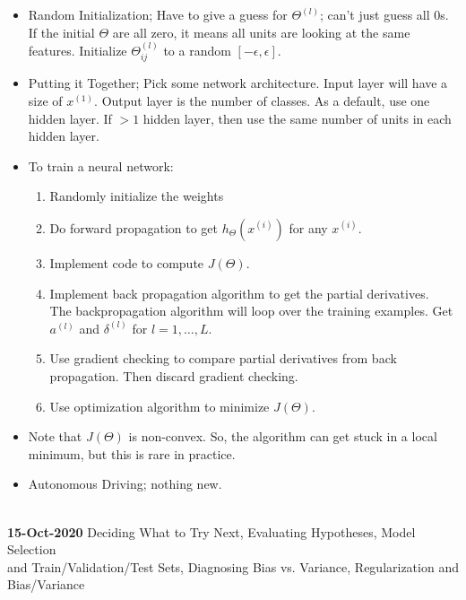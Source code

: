 \documentclass[10pt]{article}
\begin{document}
\begin{itemize}
  \item Random Initialization; Have to give a guess for $\Theta^{(l)}$; can't just guess all 0s. If the initial $\Theta$ are all zero, it means all units are looking at the same features. Initialize $\Theta_{ij}^{(l)}$ to a random $[ -\epsilon, \epsilon ]$.
  \item Putting it Together; Pick some network architecture. Input
    layer will have a size of $x^{(1)}$. Output layer is the number of
    classes. As a default, use one hidden layer. If $>1$ hidden layer,
    then use the same number of units in each hidden layer.
    \item To train a neural network:
      \begin{enumerate}
        \item Randomly initialize the weights
        \item Do forward propagation to get $h_{\Theta}(x^{(i)})$ for any $x^{(i)}$.
        \item Implement code to compute $J( \Theta )$.
        \item Implement back propagation algorithm to get the partial derivatives. \\
          The backpropagation algorithm will loop over the training examples. Get $a^{(l)}$ and $\delta^{(l)}$ for $l=1, \dots, L$.
        \item Use gradient checking to compare partial derivatives from back propagation. Then discard gradient checking.
        \item Use optimization algorithm to minimize $J( \Theta )$.
      \end{enumerate}
    \item Note that $J( \Theta )$ is non-convex. So, the algorithm can get stuck in a local minimum, but this is rare in practice.
    \item Autonomous Driving; nothing new.
\end{itemize}
\hfill \\
{\large \textbf{15-Oct-2020} Deciding What to Try Next, Evaluating Hypotheses, Model Selection \\ and Train/Validation/Test Sets, Diagnosing Bias vs. Variance, Regularization and Bias/Variance}
\end{document}

